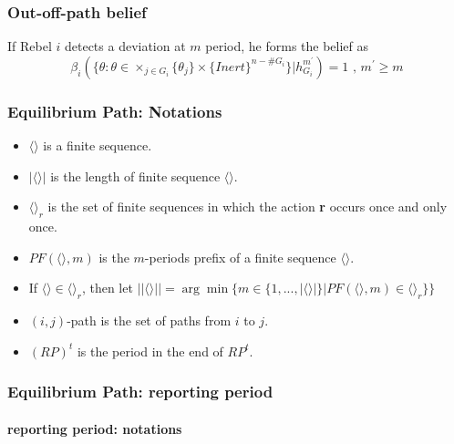 \documentclass[12pt,letter]{article}
\theoremstyle{definition}
\theoremstyle{remark}
\theoremstyle{claim}
\begin{document}
\subsubsection{Out-off-path belief}

If Rebel $i$ detects a deviation at $m$ period, he forms the belief as
\begin{equation}
\beta_{i}(\{\theta:\theta\in \times_{j\in G_i}\{\theta_j\}\times\{Inert\}^{n-\#G_i}\}|h^{m^{'}}_{G_i})=1 \text{ , } m^{'}\geq m
\end{equation}



\subsubsection{Equilibrium Path: Notations}


\begin{itemize}
\item $\langle \rangle$ is a finite sequence.
\item $|\langle \rangle|$ is the length of finite sequence $\langle \rangle$.
\item $\langle \rangle_r$ is the set of finite sequences in which the action \textbf{r} occurs once and only once.
\item $PF(\langle \rangle,m)$ is the $m$-periods prefix of a finite sequence $\langle \rangle$.
\item If $\langle \rangle\in \langle \rangle_r$, then let $||\langle \rangle||=\arg\min\{m\in\{1,...,|\langle \rangle|\}|PF(\langle \rangle,m)\in \langle \rangle_r\}\}$ 
\item $(i,j)$-path is the set of paths from $i$ to $j$.
\item $(RP)^t$ is the period in the end of $RP^t$.

\end{itemize}

\subsubsection{Equilibrium Path: reporting period}

\paragraph{reporting period: notations}
\end{document}
